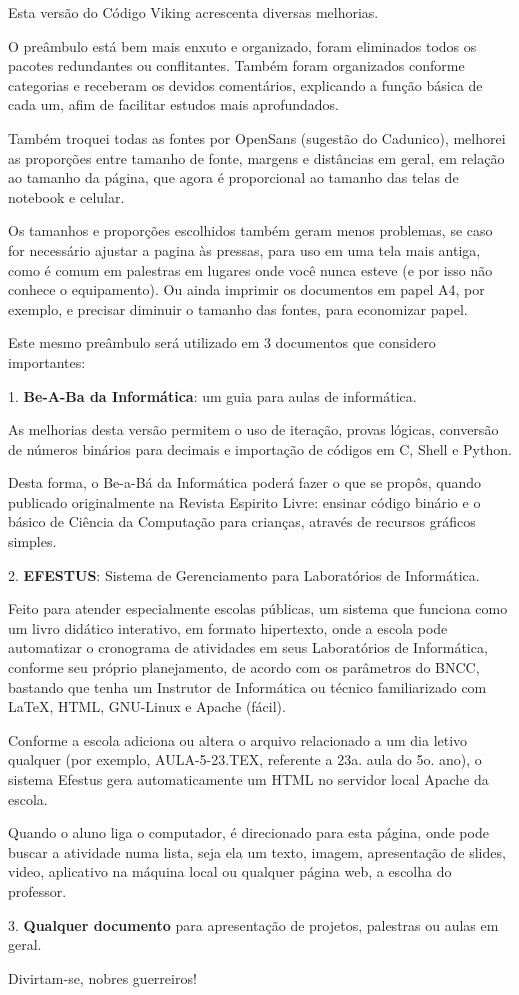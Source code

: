 \begin{multicols}{2}
	{\normalsize
Esta versão do Código Viking acrescenta diversas melhorias.

O preâmbulo está bem mais enxuto e organizado, foram eliminados todos os pacotes redundantes ou conflitantes. Também foram organizados conforme categorias e receberam os devidos comentários, explicando a função básica de cada um, afim de facilitar estudos mais aprofundados.

Também troquei todas as fontes por OpenSans (sugestão do Cadunico), melhorei as proporções entre tamanho de fonte, margens e distâncias em geral, em relação ao tamanho da página, que agora é proporcional ao tamanho das telas de notebook e celular.

Os tamanhos e proporções escolhidos também geram menos problemas, se caso for necessário ajustar a pagina às pressas, para uso em uma tela mais antiga, como é comum em palestras em lugares onde você nunca esteve (e por isso não conhece o equipamento). Ou ainda imprimir os documentos em papel A4, por exemplo, e precisar diminuir o tamanho das fontes, para economizar papel.

Este mesmo preâmbulo será utilizado em 3 documentos que considero importantes: 

1. \textbf{Be-A-Ba da Informática}: um guia para aulas de informática.

As melhorias desta versão permitem o uso de iteração, provas lógicas, conversão de números binários para decimais e importação de códigos em C, Shell e Python.

Desta forma, o Be-a-Bá da  Informática poderá fazer o que se propôs, quando publicado originalmente na Revista Espirito Livre: ensinar código binário e o básico de Ciência da Computação para crianças, através de recursos gráficos simples.

2.\textbf{ EFESTUS}: Sistema de Gerenciamento para Laboratórios de Informática.

Feito para atender especialmente escolas públicas, um sistema que funciona como um livro didático interativo, em formato hipertexto, onde a escola pode automatizar o cronograma de atividades em seus Laboratórios de Informática, conforme seu próprio planejamento, de acordo com os parâmetros do BNCC, bastando que tenha um Instrutor de Informática ou técnico familiarizado com LaTeX, HTML, GNU-Linux e Apache (fácil).

Conforme a escola adiciona ou altera o arquivo relacionado a um dia letivo qualquer (por exemplo, AULA-5-23.TEX, referente a 23a. aula do 5o. ano), o sistema Efestus gera automaticamente um HTML no servidor local Apache da escola.

Quando o aluno liga o computador, é direcionado para esta página, onde pode buscar a atividade numa lista, seja ela um texto, imagem, apresentação de slides, video, aplicativo na máquina local ou qualquer página web, a escolha do professor.

3. \textbf{Qualquer documento} para apresentação de projetos, palestras ou aulas em geral.

Divirtam-se, nobres guerreiros!}
\end{multicols}

\null
\pagebreak
